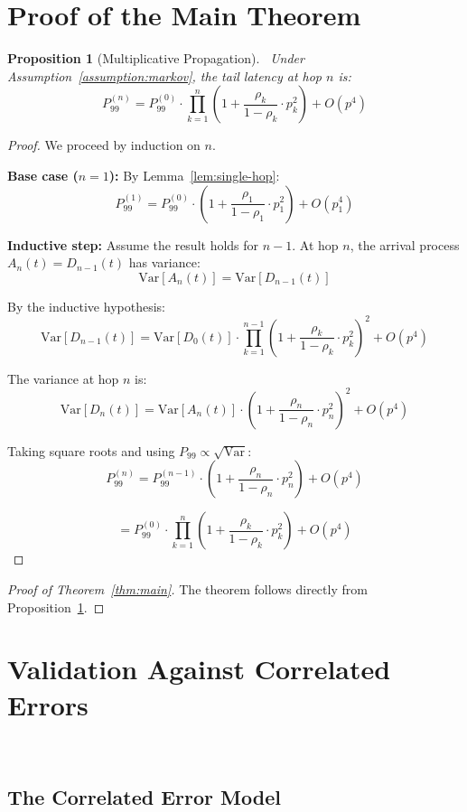 \documentclass[11pt]{article}
\newtheorem{proposition}[theorem]{Proposition}
\begin{document}
\section{Proof of the Main Theorem}

\begin{proposition}[Multiplicative Propagation]~\label{prop:multiplicative}
Under Assumption~\ref{assumption:markov}, the tail latency at hop $n$ is:
$$P_{99}^{(n)} = P_{99}^{(0)} \cdot \prod_{k=1}^{n} \left(1 + \frac{\rho_k}{1-\rho_k} \cdot p_k^2\right) + O(p^4)$$
\end{proposition}

\begin{proof}
We proceed by induction on $n$.

\textbf{Base case ($n=1$):}
By Lemma~\ref{lem:single-hop}:
$$P_{99}^{(1)} = P_{99}^{(0)} \cdot \left(1 + \frac{\rho_1}{1-\rho_1} \cdot p_1^2\right) + O(p_1^4)$$

\textbf{Inductive step:}
Assume the result holds for $n-1$. At hop $n$, the arrival process $A_n(t) = D_{n-1}(t)$ has variance:
$$\text{Var}[A_n(t)] = \text{Var}[D_{n-1}(t)]$$

By the inductive hypothesis:
$$\text{Var}[D_{n-1}(t)] = \text{Var}[D_0(t)] \cdot \prod_{k=1}^{n-1} \left(1 + \frac{\rho_k}{1-\rho_k} \cdot p_k^2\right)^2 + O(p^4)$$

The variance at hop $n$ is:
$$\text{Var}[D_n(t)] = \text{Var}[A_n(t)] \cdot \left(1 + \frac{\rho_n}{1-\rho_n} \cdot p_n^2\right)^2 + O(p^4)$$

Taking square roots and using $P_{99} \propto \sqrt{\text{Var}}$:
$$P_{99}^{(n)} = P_{99}^{(n-1)} \cdot \left(1 + \frac{\rho_n}{1-\rho_n} \cdot p_n^2\right) + O(p^4)$$

$$= P_{99}^{(0)} \cdot \prod_{k=1}^{n} \left(1 + \frac{\rho_k}{1-\rho_k} \cdot p_k^2\right) + O(p^4)$$
\end{proof}

\begin{proof}[Proof of Theorem~\ref{thm:main}]
The theorem follows directly from Proposition~\ref{prop:multiplicative}.
\end{proof}

\section{Validation Against Correlated Errors}~\label{sec:validation}

\subsection{The Correlated Error Model}
\end{document}
